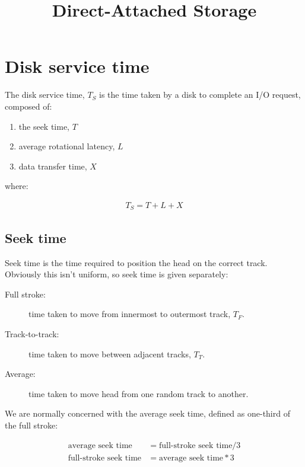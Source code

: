 \documentclass[slides]{pgnotes}
\title{Direct-Attached Storage}
\begin{document}
\maketitle

\tableofcontents

\section{Disk service time}
\label{sec:disk-service-time}

The disk service time, $T_S$ is the time taken by a disk to complete an I/O
request, composed of:

\begin{enumerate}
\item
  the seek time, $T$
\item
  average rotational latency, $L$
\item
  data transfer time, $X$
\end{enumerate}

where:

\begin{align}
  T_S = T + L + X
\end{align}

\subsection{Seek time}\label{sec:seek-time}

Seek time is the time required to position the head on the correct
track. Obviously this isn't uniform, so seek time is given separately:

\begin{description}
\item[Full stroke:]
  time taken to move from innermost to outermost track, $T_F$.
\item[Track-to-track:]
  time taken to move between adjacent tracks, $T_T$.
\item[Average:]
  time taken to move head from one random track to another.
\end{description}

We are normally concerned with the average seek time, defined as one-third of the full stroke:

\begin{align}
  \mbox{average seek time} & = \mbox{full-stroke seek time} / 3 \\
  \mbox{full-stroke seek time} & = \mbox{average seek time} * 3
\end{align}
\end{document}

